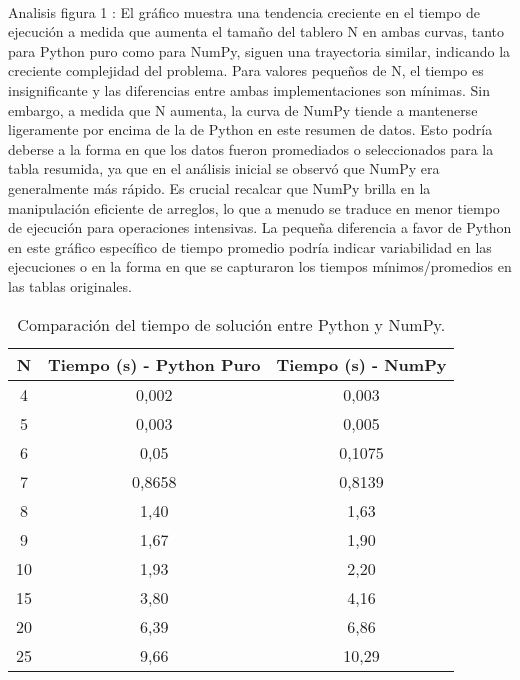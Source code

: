 \documentclass[journal]{IEEEtran}
\begin{document}
\\Analisis figura 1 :
El gráfico muestra una tendencia creciente en el tiempo de ejecución a medida que aumenta el tamaño del tablero N en ambas curvas, tanto para Python puro como para NumPy, siguen una trayectoria similar, indicando la creciente complejidad del problema. Para valores pequeños de N, el tiempo es insignificante y las diferencias entre ambas implementaciones son mínimas. Sin embargo, a medida que N aumenta, la curva de NumPy tiende a mantenerse ligeramente por encima de la de Python en este resumen de datos. Esto podría deberse a la forma en que los datos fueron promediados o seleccionados para la tabla resumida, ya que en el análisis inicial se observó que NumPy era generalmente más rápido. Es crucial recalcar que NumPy brilla en la manipulación eficiente de arreglos, lo que a menudo se traduce en menor tiempo de ejecución para operaciones intensivas. La pequeña diferencia a favor de Python en este gráfico específico de tiempo promedio podría indicar variabilidad en las ejecuciones o en la forma en que se capturaron los tiempos mínimos/promedios en las tablas originales.
\begin{table}[h!]
\centering
\begin{tabular}{|c|c|c|}
\hline
\textbf{N} & \textbf{Tiempo (s) - Python Puro} & \textbf{Tiempo (s) - NumPy} \\
\hline
4 & 0,002 & 0,003 \\
\hline
5 & 0,003 & 0,005 \\
\hline
6 & 0,05 & 0,1075 \\
\hline
7 & 0,8658 & 0,8139 \\
\hline
8 & 1,40 & 1,63 \\
\hline
9 & 1,67 & 1,90 \\
\hline
10 & 1,93 & 2,20 \\
\hline
15 & 3,80 & 4,16 \\
\hline
20 & 6,39 & 6,86 \\
\hline
25 & 9,66 & 10,29 \\
\hline
\end{tabular}
\caption{Comparación del tiempo de solución entre Python y NumPy.}
\label{tab:tiempo_resumen}
\end{table} 
\end{document}
